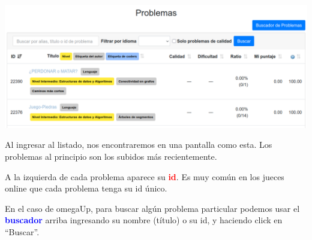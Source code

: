 \documentclass{beamer}
\begin{document}
    \begin{frame}[noframenumbering]
        \begin{center}
            \includegraphics[width=.8\linewidth]{./res/ou_problems.png}
        \end{center} \pause
        

        Al ingresar al listado, nos encontraremos en una pantalla como esta. Los problemas al principio son los subidos más recientemente. \pause

        A la izquierda de cada problema aparece su \textbf{\textcolor{red}{id}}. Es muy común en los jueces online que cada problema tenga su id único. \pause

        En el caso de omegaUp, para buscar algún problema particular podemos usar el \textcolor{blue}{\textbf{buscador}} arriba ingresando su nombre (título) o su id, y haciendo click en ``Buscar''.
    \end{frame}
\end{document}

